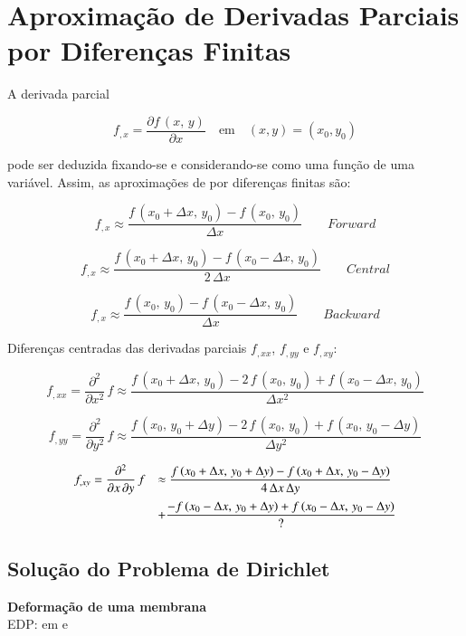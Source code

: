 \section{Aproximação de Derivadas Parciais por Diferenças Finitas}

A derivada parcial

\[
 f_{,x} = \frac{\partial f\,(x,\,y)}{\partial x} \quad \mbox{em} \quad (x,y) = (x_{0},y_{0})
\]

pode ser deduzida fixando-se  e considerando-se  como uma função de uma variável. Assim, as aproximações de  por diferenças finitas são:

\[
 f_{,x} \approx \frac{f\,(x_0 + \Delta x,\,y_0) - f\,(x_0,\,y_0)}{\Delta x} \qquad Forward
\]

\[
 f_{,x} \approx \frac{f\,(x_0 + \Delta x,\,y_0) - f\,(x_0 - \Delta x,\,y_0)}{2\,\Delta x} \qquad Central
\]

\[
 f_{,x} \approx \frac{f\,(x_0,\,y_0) - f\,(x_0 - \Delta x,\,y_0)}{\Delta x} \qquad Backward
\]

Diferenças centradas das derivadas parciais $f_{,xx}$, $f_{,yy}$ e $f_{,xy}$:

\[
 f_{,xx} = \frac{\partial^2}{\partial x^2} \, f \approx \frac{f\,(x_0 + \Delta x,\, y_0) - 2\,f\,(x_0,\,y_0) + f\,(x_0 - \Delta x,\,y_0)}{\Delta x^2}
\]

\[
 f_{,yy} = \frac{\partial^2}{\partial y^2} \, f \approx \frac{f\,(x_0,\, y_0 + \Delta y) - 2\,f\,(x_0,\,y_0) + f\,(x_0,\, y_0 - \Delta y)}{\Delta y^2}
\]

\[
 \begin{array}{ll}
  f_{,xy} = \displaystyle \frac{\partial^2}{\partial x \, \partial y} \, f & \approx \displaystyle \frac{f\,(x_0 + \Delta x,\, y_0 + \Delta y) - f\,(x_0 + \Delta x,\,y_0 - \Delta y)}{4\,\Delta x \, \Delta y} \vspace*{0.2cm} \\
   & + \displaystyle \frac{-f\,(x_0 - \Delta x,\, y_0 + \Delta y) + f\,(x_0 - \Delta x,\, y_0 - \Delta y)}{?}
 \end{array}
\]

\subsection{Solução do Problema de Dirichlet}

\textbf{Deformação de uma membrana}\\

EDP:  em  e  \\

